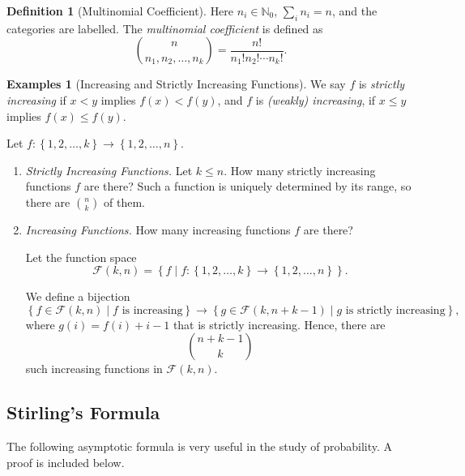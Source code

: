 \documentclass[11pt]{article}
\numberwithin{equation}{section}
\theoremstyle{definition}
\newtheorem{definition}[theorem]{Definition}
\newtheorem{examples}[theorem]{Examples}
\theoremstyle{remark}
\newcommand{\pqty}[1]{\left(#1\right)}
\newcommand{\Bqty}[1]{\left\{#1\right\}}
\newcommand{\set}[2]{\left\{#1\mid #2\right\}}
\newcommand{\functiondomain}[3]{#1:#2\to #3}
\newcommand{\NN}{\mathbb N}
\newcommand{\eventSpace}{\mathcal F}
\begin{document}
\begin{definition}[Multinomial Coefficient]\label{probability-definition-006}
    \label{probability-def:multinomial-coeff}
Here \(n_i\in\NN_0\), \(\sum_i n_i=n\), and the categories are labelled.
%
    The \emph{multinomial coefficient} is defined as
    \[
        \binom{n}{n_1, n_2, \ldots, n_k} = \frac{n!}{n_1! n_2! \cdots n_k!}.
    \]
\end{definition}

\begin{examples}[Increasing and Strictly Increasing Functions]\label{probability-examples-001}
    \label{probability-ex:increasing-functions}%
    We say \(f\) is \emph{strictly increasing} if \(x < y\) implies \(f\pqty{x} < f\pqty{y}\), and \(f\) is \emph{(weakly) increasing}, if \(x \leq y\) implies \(f\pqty{x} \leq f\pqty{y}\).

    Let \(\functiondomain{f}{\Bqty{1, 2, \ldots, k}}{\Bqty{1, 2, \ldots, n}}\).
    
    \begin{enumerate}
        \item \textit{Strictly Increasing Functions.} Let \(k \leq n\). How many strictly increasing functions \(f\) are there? Such a function is uniquely determined by its range, so there are \(\binom{n}{k}\) of them.
        \item \textit{Increasing Functions.} How many increasing functions \(f\) are there?
        
        Let the function space
        \[
            \eventSpace\pqty{k, n} = \set{f}{\functiondomain{f}{\Bqty{1, 2, \ldots, k}}{\Bqty{1, 2, \ldots, n}}}.
        \]
        
        We define a bijection
        \[
            \set{f \in \eventSpace\pqty{k, n}}{f \text{ is increasing}} \to \set{g \in \eventSpace\pqty{k, n + k - 1}}{g \text{ is strictly increasing}},
        \]
        where \(g\pqty{i} = f\pqty{i} + i - 1\) that is strictly increasing. Hence, there are
        \[
            \binom{n + k - 1}{k}
        \]
        such increasing functions in \(\eventSpace\pqty{k, n}\).
    \end{enumerate}
\end{examples}

\subsection{Stirling's Formula}

The following asymptotic formula is very useful in the study of probability. A proof is included below.
\end{document}
